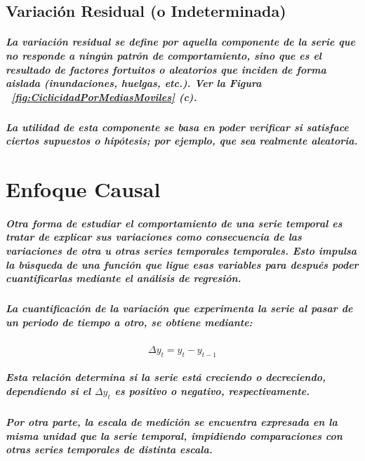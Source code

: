 \section{Variación Residual (o Indeterminada)}
\paragraph{
La \emph{variación residual} se define por aquella componente de la serie que no responde a ningún patrón de comportamiento, sino que es el resultado de factores fortuitos o aleatorios que inciden de forma aislada (inundaciones, huelgas, etc.). Ver la Figura ~\ref{fig:CiclicidadPorMediasMoviles} (c).
}
\paragraph{
La utilidad de esta componente se basa en poder verificar si satisface ciertos supuestos o hipótesis; por ejemplo, que sea realmente aleatoria.
}




\chapter{Enfoque Causal}
\paragraph{
Otra forma de estudiar el comportamiento de una \emph{serie temporal} es tratar de explicar sus variaciones como consecuencia de las variaciones de otra u otras series temporales temporales. Esto impulsa la búsqueda de una función que ligue esas variables para después poder cuantificarlas mediante el análisis de regresión.
}
\paragraph{
La \emph{cuantificación de la variación} que experimenta la serie al pasar de un periodo de tiempo a otro, se obtiene mediante:
}
\begin{equation}
\Delta y_t = y_t - y_{t-1}
\end{equation}
\paragraph*{
Esta relación determina si la serie está \emph{creciendo} o \emph{decreciendo}, dependiendo si el $\Delta y_t$ es positivo o negativo, respectivamente.
}
\paragraph{
Por otra parte, la escala de medición se encuentra expresada en la misma unidad que la serie temporal, impidiendo \emph{comparaciones} con otras series temporales de distinta escala.
}
